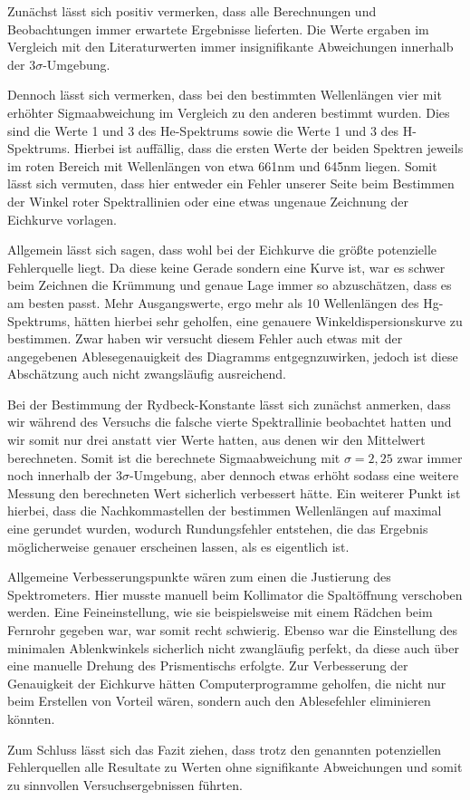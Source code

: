 \documentclass{article}
\begin{document}
Zunächst lässt sich positiv vermerken, dass alle Berechnungen und Beobachtungen immer erwartete Ergebnisse lieferten. Die Werte ergaben im Vergleich mit den Literaturwerten immer insignifikante Abweichungen innerhalb der $3\sigma$-Umgebung.

Dennoch lässt sich vermerken, dass bei den bestimmten Wellenlängen vier mit erhöhter Sigmaabweichung im Vergleich zu den anderen bestimmt wurden. Dies sind die Werte 1 und 3 des He-Spektrums sowie die Werte 1 und 3 des H-Spektrums. Hierbei ist auffällig, dass die ersten Werte der beiden Spektren jeweils im roten Bereich mit Wellenlängen von etwa 661nm und 645nm liegen. Somit lässt sich vermuten, dass hier entweder ein Fehler unserer Seite beim Bestimmen der Winkel roter Spektrallinien oder eine etwas ungenaue Zeichnung der Eichkurve vorlagen. 

Allgemein lässt sich sagen, dass wohl bei der Eichkurve die größte potenzielle Fehlerquelle liegt. Da diese keine Gerade sondern eine Kurve ist, war es schwer beim Zeichnen die Krümmung und genaue Lage immer so abzuschätzen, dass es am besten passt. Mehr Ausgangswerte, ergo mehr als 10 Wellenlängen des Hg-Spektrums, hätten hierbei sehr geholfen, eine genauere Winkeldispersionskurve zu bestimmen. Zwar haben wir versucht diesem Fehler auch etwas mit der angegebenen Ablesegenauigkeit des Diagramms entgegnzuwirken, jedoch ist diese Abschätzung auch nicht zwangsläufig ausreichend. 

Bei der Bestimmung der Rydbeck-Konstante lässt sich zunächst anmerken, dass wir während des Versuchs die falsche vierte Spektrallinie beobachtet hatten und wir somit nur drei anstatt vier Werte hatten, aus denen wir den Mittelwert berechneten. Somit ist die berechnete Sigmaabweichung mit $\sigma = 2,25$ zwar immer noch innerhalb der $3\sigma$-Umgebung, aber dennoch etwas erhöht sodass eine weitere Messung den berechneten Wert sicherlich verbessert hätte. Ein weiterer Punkt ist hierbei, dass die Nachkommastellen der bestimmen Wellenlängen auf maximal eine gerundet wurden, wodurch Rundungsfehler entstehen, die das Ergebnis möglicherweise genauer erscheinen lassen, als es eigentlich ist. 

Allgemeine Verbesserungspunkte wären zum einen die Justierung des Spektrometers. Hier musste manuell beim Kollimator die Spaltöffnung verschoben werden. Eine Feineinstellung, wie sie beispielsweise mit einem Rädchen beim Fernrohr gegeben war, war somit recht schwierig. Ebenso war die Einstellung des minimalen Ablenkwinkels sicherlich nicht zwangläufig perfekt, da diese auch über eine manuelle Drehung des Prismentischs erfolgte. Zur Verbesserung der Genauigkeit der Eichkurve hätten Computerprogramme geholfen, die nicht nur beim Erstellen von Vorteil wären, sondern auch den Ablesefehler eliminieren könnten.

Zum Schluss lässt sich das Fazit ziehen, dass trotz den genannten potenziellen Fehlerquellen alle Resultate zu Werten ohne signifikante Abweichungen und somit zu sinnvollen Versuchsergebnissen führten.
\end{document}
